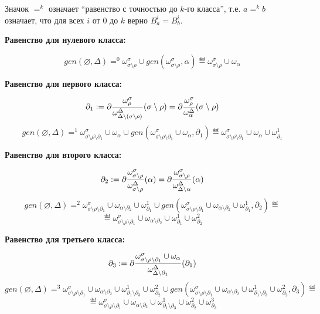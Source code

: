 



Значок $=^k$ означает ``равенство с точностью до $k$-го класса'', т.е. $a =^k b$ означает, что для всех $i$ от $0$ до $k$ верно $B^i_a = B^i_b$.

\textbf{Равенство для нулевого класса:}

$$gen(\varnothing, \Delta) =^0 \omega^\sigma_{\sigma\setminus\rho} \cup gen(\omega^\sigma_{\sigma\setminus\rho}, \alpha) \eqdef \omega^\sigma_{\sigma\setminus\rho} \cup \omega_\alpha$$

\textbf{Равенство для первого класса:}

$$\partial_1 := \partial\dfrac{\omega^\sigma_\rho}{\omega^\Delta_{\Delta\setminus(\sigma\setminus\rho)}}(\sigma\setminus\rho) = \partial\dfrac{\omega^\sigma_\rho}{\omega^\Delta_\alpha}(\sigma\setminus\rho)$$
$$gen(\varnothing, \Delta) =^1 \omega^\sigma_{\sigma\setminus\rho\setminus{\partial_1}} \cup \omega_\alpha \cup gen(\omega^\sigma_{\sigma\setminus\rho\setminus{\partial_1}} \cup \omega_\alpha, \partial_1) \eqdef \omega^\sigma_{\sigma\setminus\rho\setminus{\partial_1}} \cup \omega_\alpha \cup \omega^1_{\partial_1}$$

\textbf{Равенство для второго класса:}

$$\partial_2 := \partial\dfrac{\omega^\sigma_{\sigma\setminus\rho}}{\omega^\Delta_{\sigma\setminus\rho}}(\alpha) = \partial\dfrac{\omega^\sigma_{\sigma\setminus\rho}}{\omega^\Delta_{\Delta\setminus\alpha}}(\alpha)$$
$$gen(\varnothing, \Delta) =^2 \omega^\sigma_{\sigma\setminus\rho\setminus{\partial_1}} \cup \omega_{\alpha\setminus\partial_2} \cup \omega^1_{\partial_1} \cup gen(\omega^\sigma_{\sigma\setminus\rho\setminus{\partial_1}} \cup \omega_{\alpha\setminus\partial_2} \cup \omega^1_{\partial_1}, \partial_2) \eqdef$$
$$\eqdef \omega^\sigma_{\sigma\setminus\rho\setminus{\partial_1}} \cup \omega_{\alpha\setminus\partial_2} \cup \omega^1_{\partial_1} \cup \omega^2_{\partial_2}$$

\textbf{Равенство для третьего класса:}

$$\partial_3 := \partial\dfrac{\omega^\sigma_{\sigma\setminus\rho\setminus{\partial_1}} \cup \omega_\alpha}{\omega^\Delta_{\Delta\setminus\partial_1}}(\partial_1)$$
$$gen(\varnothing, \Delta) =^3 \omega^\sigma_{\sigma\setminus\rho\setminus{\partial_1}} \cup \omega_{\alpha\setminus\partial_2} \cup \omega^1_{\partial_1\setminus\partial_3} \cup \omega^2_{\partial_2} \cup gen(\omega^\sigma_{\sigma\setminus\rho\setminus{\partial_1}} \cup \omega_{\alpha\setminus\partial_2} \cup \omega^1_{\partial_1\setminus\partial_3} \cup \omega^2_{\partial_2}, \partial_3) \eqdef$$
$$\eqdef \omega^\sigma_{\sigma\setminus\rho\setminus{\partial_1}} \cup \omega_{\alpha\setminus\partial_2} \cup \omega^1_{\partial_1\setminus\partial_3} \cup \omega^2_{\partial_2} \cup \omega^3_{\partial_3}$$

